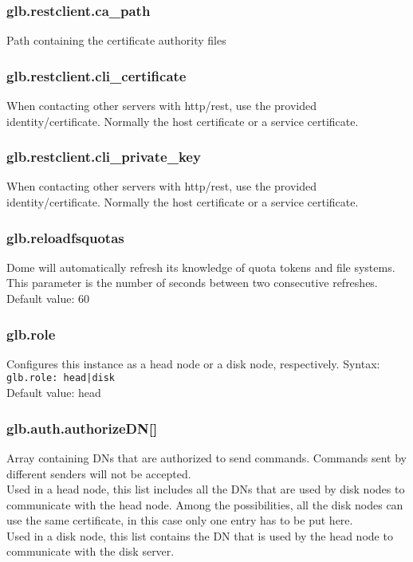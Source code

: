 \documentclass[a4paper,10pt]{scrreprt}
\begin{document}
\subsubsection{glb.restclient.ca\_path}
Path containing the certificate authority files
\subsubsection{glb.restclient.cli\_certificate}
When contacting other servers with http/rest, use the provided identity/certificate. Normally the host certificate or a service certificate.
\subsubsection{glb.restclient.cli\_private\_key}
When contacting other servers with http/rest, use the provided identity/certificate. Normally the host certificate or a service certificate.


\subsubsection{glb.reloadfsquotas}
Dome will automatically refresh its knowledge of quota tokens and file systems. This parameter is the number of seconds between two consecutive refreshes.\\
Default value: 60\\

\subsubsection{glb.role}
Configures this instance as a head node or a disk node, respectively.
Syntax:\\
\lstinline"glb.role: head|disk"\\
Default value: head\\

\subsubsection{glb.auth.authorizeDN[]}
Array containing DNs that are authorized to send commands. Commands sent by different senders will not be accepted.\\
Used in a head node, this list includes all the DNs that are used by disk nodes to communicate with the head node. Among the possibilities, all the disk nodes can use the same certificate, in this case only one entry has to be put here.\\
Used in a disk node, this list contains the DN that is used by the head node to communicate with the disk server.\\
\end{document}
